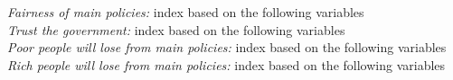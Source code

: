 \documentclass{article}
\begin{document}
\textit{Fairness of main policies:} index based on the following variables\\
\textit{Trust the government:} index based on the following variables\\
\textit{Poor people will lose from main policies:} index based on the following variables\\
\textit{Rich people will lose from main policies:} index based on the following variables\\
\end{document}
